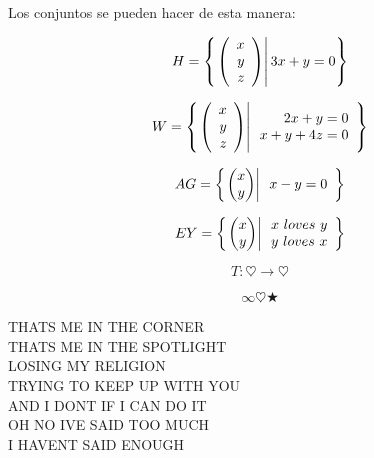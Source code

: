 \documentclass[10pt]{article}
\begin{document}
\problem{}

Los conjuntos se pueden hacer de esta manera:

$$H=\left\{ \left. \left( \begin{array}{r} x\\ y\\ z \end{array} \right) \right| 3x+y=0 \right\} $$

$$W=\left\{ \left. \left( \begin{array}{r} x\\ y\\ z \end{array} \right) \right| \begin{array}{r}
2x+y=0\\
x+y+4z=0\\
\end{array} \right\} $$

$$AG=\llaves{\vectrdos{x}{y}}{\begin{array}{r}
x-y=0\\


\end{array}}$$

$$EY=\left\{ \left. \begin{pmatrix} x\\ y\\ \end{pmatrix} \right| \begin{array}{r}
x\ loves\ y\\
y\ loves\ x\\
\end{array} \right\}$$

$$T : \heartsuit \rightarrow \heartsuit$$

$$\infty \heartsuit \bigstar $$

THATS ME IN THE CORNER~\\
THATS ME IN THE SPOTLIGHT\\
LOSING MY RELIGION~\\
TRYING TO KEEP UP WITH YOU~\\
AND I DONT IF I CAN DO IT~\\
OH NO IVE SAID TOO MUCH~\\
I HAVENT SAID ENOUGH
\end{document}
